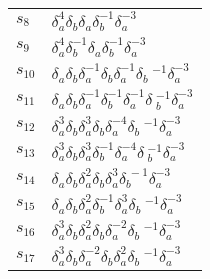 \documentclass{article}
\begin{document}
\begin{center}
\begin{tabular}{ll}
$s_{8}$ & $\delta_a^{4}\delta_b^{}\delta_a^{}\delta_b^{-1}\delta_a^{-3}$ \\
$s_{9}$ & $\delta_a^{4}\delta_b^{-1}\delta_a^{}\delta_b^{-1}\delta_a^{-3}$ \\
$s_{10}$ & $\delta_a^{}\delta_b^{}\delta_a^{-1}\delta_b^{}\delta_a^{-1}\delta_b\
^{-1}\delta_a^{-3}$ \\
$s_{11}$ & $\delta_a^{}\delta_b^{}\delta_a^{-1}\delta_b^{-1}\delta_a^{-1}\delta\
_b^{-1}\delta_a^{-3}$ \\
$s_{12}$ & $\delta_a^{3}\delta_b^{}\delta_a^{3}\delta_b^{}\delta_a^{-4}\delta_b\
^{-1}\delta_a^{-3}$ \\
$s_{13}$ & $\delta_a^{3}\delta_b^{}\delta_a^{3}\delta_b^{-1}\delta_a^{-4}\delta\
_b^{-1}\delta_a^{-3}$ \\
$s_{14}$ & $\delta_a^{}\delta_b^{}\delta_a^{2}\delta_b^{}\delta_a^{3}\delta_b^{\
-1}\delta_a^{-3}$ \\
$s_{15}$ & $\delta_a^{}\delta_b^{}\delta_a^{2}\delta_b^{-1}\delta_a^{3}\delta_b\
^{-1}\delta_a^{-3}$ \\
$s_{16}$ & $\delta_a^{3}\delta_b^{}\delta_a^{2}\delta_b^{}\delta_a^{-2}\delta_b\
^{-1}\delta_a^{-3}$ \\
$s_{17}$ & $\delta_a^{3}\delta_b^{}\delta_a^{-2}\delta_b^{}\delta_a^{2}\delta_b\
^{-1}\delta_a^{-3}$ \\
\bottomrule
\end{tabular}
\end{center}

\thispagestyle{empty}
\end{document}
